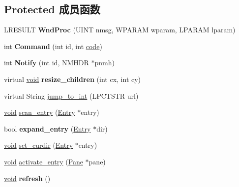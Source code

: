\subsection*{Protected 成员函数}
\begin{DoxyCompactItemize}
\item 
\mbox{\label{struct_file_child_window_ab786efc5f2f557e2a50ae655727c29a8}} 
L\+R\+E\+S\+U\+LT {\bfseries Wnd\+Proc} (U\+I\+NT nmsg, W\+P\+A\+R\+AM wparam, L\+P\+A\+R\+AM lparam)
\item 
\mbox{\label{struct_file_child_window_aa8d9f2b12273327820bb54d042c76b78}} 
int {\bfseries Command} (int id, int \hyperlink{structcode}{code})
\item 
\mbox{\label{struct_file_child_window_a6afae299b4803c0eeae7bb079e1cb305}} 
int {\bfseries Notify} (int id, \hyperlink{structtag_n_m_h_d_r}{N\+M\+H\+DR} $\ast$pnmh)
\item 
\mbox{\label{struct_file_child_window_ad6ce3f9f968afb8f94bfd1c313448beb}} 
virtual \hyperlink{interfacevoid}{void} {\bfseries resize\+\_\+children} (int cx, int cy)
\item 
virtual String \hyperlink{struct_file_child_window_aed746ad1a9c8ebb3d07032b111f402bd}{jump\+\_\+to\+\_\+int} (L\+P\+C\+T\+S\+TR url)
\item 
\hyperlink{interfacevoid}{void} \hyperlink{struct_file_child_window_a6966bc5ed4f9a7dec37670237ea871e9}{scan\+\_\+entry} (\hyperlink{struct_entry}{Entry} $\ast$entry)
\item 
\mbox{\label{struct_file_child_window_a38767c8f27d7a22f159f2248a7e7e3e0}} 
bool {\bfseries expand\+\_\+entry} (\hyperlink{struct_entry}{Entry} $\ast$dir)
\item 
\hyperlink{interfacevoid}{void} \hyperlink{struct_file_child_window_a150ccb0046f5e847a6129d33a3843da7}{set\+\_\+curdir} (\hyperlink{struct_entry}{Entry} $\ast$entry)
\item 
\hyperlink{interfacevoid}{void} \hyperlink{struct_file_child_window_a32a45a31f8f8ea8d9a2cf9f0a06553aa}{activate\+\_\+entry} (\hyperlink{struct_pane}{Pane} $\ast$pane)
\item 
\mbox{\label{struct_file_child_window_ae8c69935748143285a44462f69792c42}} 
\hyperlink{interfacevoid}{void} {\bfseries refresh} ()
\end{DoxyCompactItemize}
